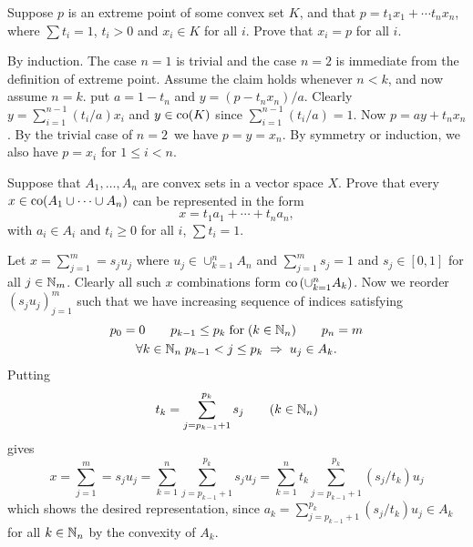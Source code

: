 \begin{enumerate}
\begin{excopy}
Suppose $p$ is an extreme point of some convex set $K$, and that
\(p = t_1x_1 + \cdots t_n x_n\), where \(\sum t_i = 1\), \(t_i > 0\)
and \(x_i \in K\) for all $i$.
Prove that \(x_i = p\) for all $i$.
\end{excopy}

By induction. The case \(n=1\) is trivial and the case \(n=2\)
is immediate from the definition of extreme point.
Assume the claim holds whenever \(n < k\),
and now assume \(n=k\).
put \(a = 1 - t_n\) and \(y = (p - t_nx_n)/a\). Clearly
\(y = \sum_{i=1}^{n-1} (t_i/a) x_i\) and \(y \in \mathop{\rm co}\nolimits(K)\) since
\(\sum_{i=1}^{n-1} (t_i/a) = 1\).
Now \(p = ay + t_nx_n\). By the trivial case of \(n=2\)\
we have \(p = y = x_n\).
By symmetry or induction, we also have  \(p = x_i\) for \(1 \leq i < n\).


\begin{excopy}
Suppose that \(A_1,\ldots,A_n\) are convex sets in a vector space $X$.
Prove that every \(x \in \mathop{\rm co}\nolimits(A_1 \cup \cdots \cup A_n)\) can be represented
in the form
\begin{equation*}
x = t_1 a_1 + \cdots + t_n a_n,
\end{equation*}
with \(a_i \in A_i\) and \(t_i \geq 0\) for all $i$, \(\sum t_i = 1\).
\end{excopy}

Let \(x = \sum_{j=1}^m = s_j u_j\) where \(u_j \in \cup_{k=1}^n A_n\) and
\(\sum_{j=1}^m s_j = 1\) and \(s_j \in [0,1]\) for all \(j\in\mathbb{N}_m\).
Clearly all such $x$ combinations form \(\mathop{\rm co}\nolimits\left(\cup_{k=1}^n A_k\right)\).
Now we reorder \((s_j u_j)_{j=1}^m\) such that 
we have increasing sequence of indices satisfying
\begin{gather*}
p_0 = 0
 \qquad
 p_{k-1} \leq p_k \;\textnormal{for}\; (k \in \mathbb{N}_n)
 \qquad
 p_n = m
 \\
 \forall k\in\mathbb{N}_n\; p_{k-1} < j \leq p_k \;\Rightarrow\; u_j \in A_k.
\end{gather*}
Putting
\begin{equation*}
t_k = \sum_{j=p_{k-1}+1}^{p_k} s_j \qquad (k \in \mathbb{N}_n)
\end{equation*}
gives
\begin{equation*}
x
 = \sum_{j=1}^m = s_j u_j
 = \sum_{k=1}^n \sum_{j=p_{k-1}+1}^{p_k} s_j u_j
 = \sum_{k=1}^n t_k \sum_{j=p_{k-1}+1}^{p_k} (s_j/t_k) u_j
\end{equation*}
which shows the desired representation, since
\(a_k = \sum_{j=p_{k-1}+1}^{p_k} (s_j/t_k) u_j \in A_k\) for all \(k\in\mathbb{N}_n\)
by the convexity of \(A_k\).


\end{enumerate}
